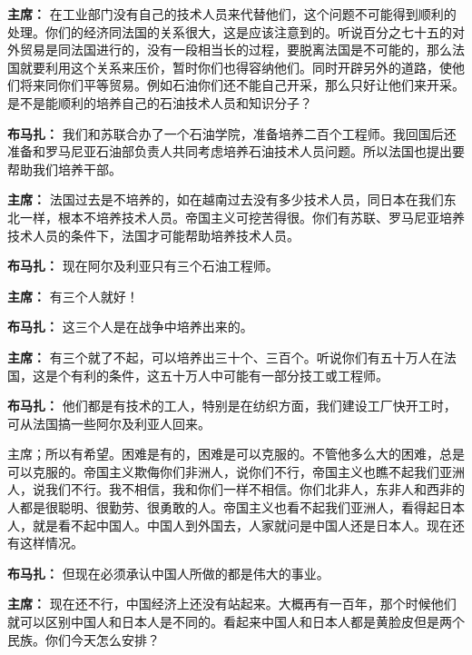 \begin{list}{}
\item[\textbf{主席：}] 在工业部门没有自己的技术人员来代替他们，这个问题不可能得到顺利的处理。你们的经济同法国的关系很大，这是应该注意到的。听说百分之七十五的对外贸易是同法国进行的，没有一段相当长的过程，要脱离法国是不可能的，那么法国就要利用这个关系来压价，暂时你们也得容纳他们。同时开辟另外的道路，使他们将来同你们平等贸易。例如石油你们还不能自己开采，那么只好让他们来开采。是不是能顺利的培养自己的石油技术人员和知识分子？

\item[\textbf{布马扎：}] 我们和苏联合办了一个石油学院，准备培养二百个工程师。我回国后还准备和罗马尼亚石油部负责人共同考虑培养石油技术人员问题。所以法国也提出要帮助我们培养干部。

\item[\textbf{主席：}] 法国过去是不培养的，如在越南过去没有多少技术人员，同日本在我们东北一样，根本不培养技术人员。帝国主义可挖苦得很。你们有苏联、罗马尼亚培养技术人员的条件下，法国才可能帮助培养技术人员。

\item[\textbf{布马扎：}] 现在阿尔及利亚只有三个石油工程师。

\item[\textbf{主席：}] 有三个人就好！

\item[\textbf{布马扎：}] 这三个人是在战争中培养出来的。

\item[\textbf{主席：}] 有三个就了不起，可以培养出三十个、三百个。听说你们有五十万人在法国，这是个有利的条件，这五十万人中可能有一部分技工或工程师。

\item[\textbf{布马扎：}] 他们都是有技术的工人，特别是在纺织方面，我们建设工厂快开工时，可从法国搞一些阿尔及利亚人回来。

主席；所以有希望。困难是有的，困难是可以克服的。不管他多么大的困难，总是可以克服的。帝国主义欺侮你们非洲人，说你们不行，帝国主义也瞧不起我们亚洲人，说我们不行。我不相信，我和你们一样不相信。你们北非人，东非人和西非的人都是很聪明、很勤劳、很勇敢的人。帝国主义也看不起我们亚洲人，看得起日本人，就是看不起中国人。中国人到外国去，人家就问是中国人还是日本人。现在还有这样情况。

\item[\textbf{布马扎：}] 但现在必须承认中国人所做的都是伟大的事业。

\item[\textbf{主席：}] 现在还不行，中国经济上还没有站起来。大概再有一百年，那个时候他们就可以区别中国人和日本人是不同的。看起来中国人和日本人都是黄脸皮但是两个民族。你们今天怎么安排？


\end{list}
